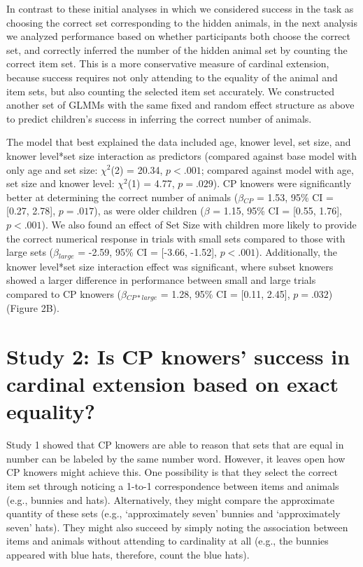 \documentclass[10pt, letterpaper]{article}
\begin{document}
In contrast to these initial analyses in which we considered success in
the task as choosing the correct set corresponding to the hidden
animals, in the next analysis we analyzed performance based on whether
participants both choose the correct set, and correctly inferred the
number of the hidden animal set by counting the correct item set. This
is a more conservative measure of cardinal extension, because success
requires not only attending to the equality of the animal and item sets,
but also counting the selected item set accurately. We constructed
another set of GLMMs with the same fixed and random effect structure as
above to predict children's success in inferring the correct number of
animals.

The model that best explained the data included age, knower level, set
size, and knower level*set size interaction as predictors (compared
against base model with only age and set size: \(\chi^2\)(2) = 20.34,
\(p < .001\); compared against model with age, set size and knower
level: \(\chi^2\)(1) = 4.77, \(p = .029\)). CP knowers were
significantly better at determining the correct number of animals
(\(\beta\)\(_{CP}\) = 1.53, 95\% CI = {[}0.27, 2.78{]}, \(p = .017\)),
as were older children (\(\beta\) = 1.15, 95\% CI = {[}0.55, 1.76{]},
\(p < .001\)). We also found an effect of Set Size with children more
likely to provide the correct numerical response in trials with small
sets compared to those with large sets (\(\beta\)\(_{large}\) = -2.59,
95\% CI = {[}-3.66, -1.52{]}, \(p < .001\)). Additionally, the knower
level*set size interaction effect was significant, where subset knowers
showed a larger difference in performance between small and large trials
compared to CP knowers (\(\beta\)\(_{CP*large}\) = 1.28, 95\% CI =
{[}0.11, 2.45{]}, \(p = .032\)) (Figure 2B).

\hypertarget{study-2-is-cp-knowers-success-in-cardinal-extension-based-on-exact-equality}{%
\section{Study 2: Is CP knowers' success in cardinal extension based on
exact
equality?}\label{study-2-is-cp-knowers-success-in-cardinal-extension-based-on-exact-equality}}

Study 1 showed that CP knowers are able to reason that sets that are
equal in number can be labeled by the same number word. However, it
leaves open how CP knowers might achieve this. One possibility is that
they select the correct item set through noticing a 1-to-1
correspondence between items and animals (e.g., bunnies and hats).
Alternatively, they might compare the approximate quantity of these sets
(e.g., `approximately seven' bunnies and `approximately seven' hats).
They might also succeed by simply noting the association between items
and animals without attending to cardinality at all (e.g., the bunnies
appeared with blue hats, therefore, count the blue hats).
\end{document}
